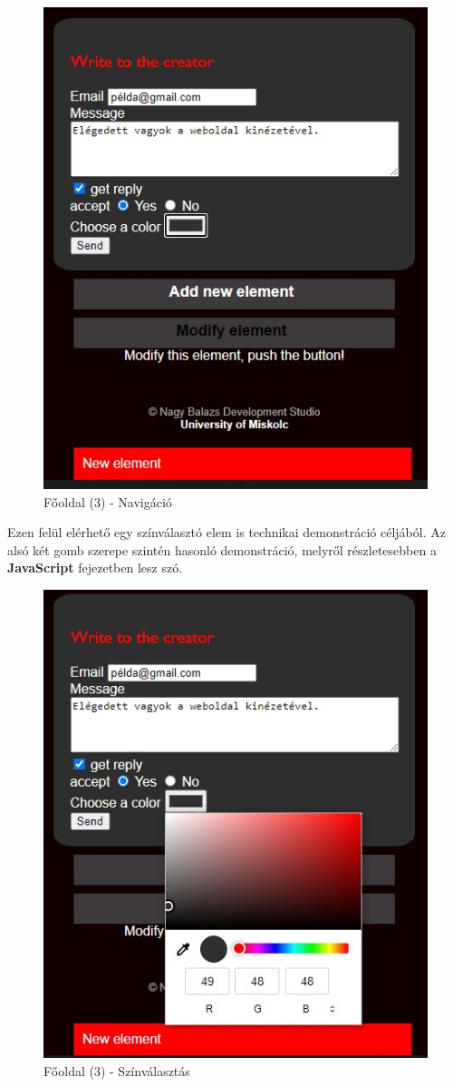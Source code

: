 \documentclass[12pt, titlepage]{article}
\begin{document}
\begin{figure}[!h]
	\centering
	\includegraphics[width=0.7\linewidth]{images/home/5.jpg}
	\caption{Főoldal (3) - Navigáció} 
\end{figure}

\pagebreak
Ezen felül elérhető egy színválasztó elem is technikai demonstráció céljából. Az alsó két gomb szerepe szintén hasonló demonstráció, melyről részletesebben a \textbf{JavaScript} fejezetben lesz szó.

\begin{figure}[!h]
	\centering
	\includegraphics[width=0.7\linewidth]{images/home/6.jpg}
	\caption{Főoldal (3) - Színválasztás} 
\end{figure}
\end{document}
